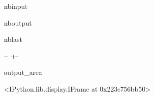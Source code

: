 \documentclass[letterpaper,10pt,english]{sphinxmanual}
\begin{document}
\begin{sphinxuseclass}{nbinput}
{
\begin{sphinxVerbatim}[commandchars=\\\{\}]
\llap{\color{nbsphinxin}[14]:\,\hspace{\fboxrule}\hspace{\fboxsep}}

                                    
\end{sphinxVerbatim}
}

\end{sphinxuseclass}
\begin{sphinxuseclass}{nboutput}
\begin{sphinxuseclass}{nblast}
{

\kern-\sphinxverbatimsmallskipamount\kern-\baselineskip
\kern+\FrameHeightAdjust\kern-\fboxrule
\vspace{\nbsphinxcodecellspacing}

\begin{sphinxuseclass}{output_area}
\begin{sphinxuseclass}{}


\begin{sphinxVerbatim}[commandchars=\\\{\}]
<IPython.lib.display.IFrame at 0x223c756bb50>
\end{sphinxVerbatim}



\end{sphinxuseclass}
\end{sphinxuseclass}
}

\end{sphinxuseclass}
\end{sphinxuseclass}
\end{document}
